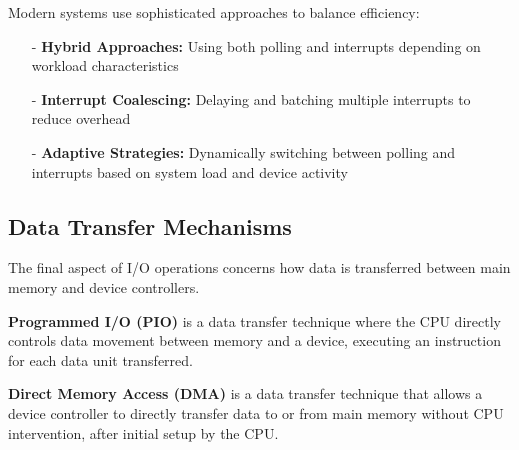 \documentclass[../../compsys.tex]{subfiles}
\begin{document}
Modern systems use sophisticated approaches to balance efficiency:

\begin{itemize}
    \item[-] \textbf{Hybrid Approaches:} Using both polling and interrupts depending on workload characteristics
    \item[-] \textbf{Interrupt Coalescing:} Delaying and batching multiple interrupts to reduce overhead
    \item[-] \textbf{Adaptive Strategies:} Dynamically switching between polling and interrupts based on system load and device activity
\end{itemize}

\subsection{Data Transfer Mechanisms}

The final aspect of I/O operations concerns how data is transferred between main memory and device controllers.

\begin{definition}
\textbf{Programmed I/O (PIO)} is a data transfer technique where the CPU directly controls data movement between memory and a device, executing an instruction for each data unit transferred.
\end{definition}

\begin{definition}
\textbf{Direct Memory Access (DMA)} is a data transfer technique that allows a device controller to directly transfer data to or from main memory without CPU intervention, after initial setup by the CPU.
\end{definition}
\end{document}
